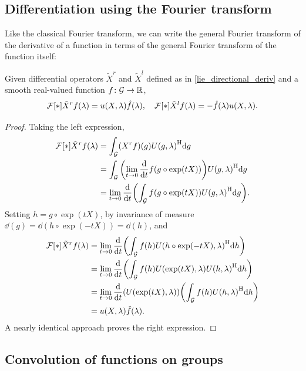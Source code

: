 \documentclass[../../main.tex]{subfiles}
\begin{document}
\begin{refsection}
	\subsection{Differentiation using the Fourier transform}

	Like the classical Fourier transform, we can write the general Fourier transform of the derivative of a function in terms of the general Fourier transform of the function itself:
	\begin{theorem}\label{fourier_direc_deriv}
		Given differential operators $\tilde{X}^r$ and $\tilde{X}^l$ defined as in \cref{lie_directional_deriv} and a smooth real-valued function $f\colon \mathcal{G} \to \mathbb{R}$,
		$$\mathcal{F}\qty[*]{\tilde{X}^r f}(\lambda) = u(X, \lambda) \hat{f}(\lambda), \quad \mathcal{F}\qty[*]{\tilde{X}^l f}(\lambda) = -\hat{f}(\lambda) u(X, \lambda).$$
	\end{theorem}
	\begin{proof}
		Taking the left expression,
		\begin{align}
			\mathcal{F}\qty[*]{\tilde{X}^r f}(\lambda)
			 & = \int_{\mathcal{G}} (X^r f)(g) {U(g, \lambda)}^\mathrm{H} \dd g                                        \\
			 & = \int_{\mathcal{G}} \qty(\lim_{t \to 0} \dv{t} f(g \circ \exp(t X))) {U(g, \lambda)}^\mathrm{H} \dd g  \\
			 & = \lim_{t \to 0} \dv{t} \qty(\int_{\mathcal{G}} f(g \circ \exp(t X)) {U(g, \lambda)}^\mathrm{H} \dd g).
		\end{align}
		Setting $h = g \circ \exp(t X)$, by invariance of measure $\dd(g) = \dd(h \circ \exp(-t X)) = \dd(h)$, and
		\begin{align}
			\mathcal{F}\qty[*]{\tilde{X}^r f}(\lambda)
			 & = \lim_{t \to 0} \dv{t} \qty(\int_{\mathcal{G}} f(h) {U(h \circ \exp(-t X), \lambda)}^\mathrm{H} \dd h)            \\
			 & = \lim_{t \to 0} \dv{t} \qty(\int_{\mathcal{G}} f(h) U(\exp(t X), \lambda) {U(h, \lambda)}^\mathrm{H} \dd h)       \\
			 & = \lim_{t \to 0} \dv{t} \qty(U(\exp(t X), \lambda)) \qty(\int_{\mathcal{G}} f(h) {U(h, \lambda)}^\mathrm{H} \dd h) \\
			 & = u(X, \lambda) \hat{f}(\lambda).
		\end{align}
		A nearly identical approach proves the right expression.
	\end{proof}

	\subsection{Convolution of functions on groups}


\end{refsection}
\end{document}
